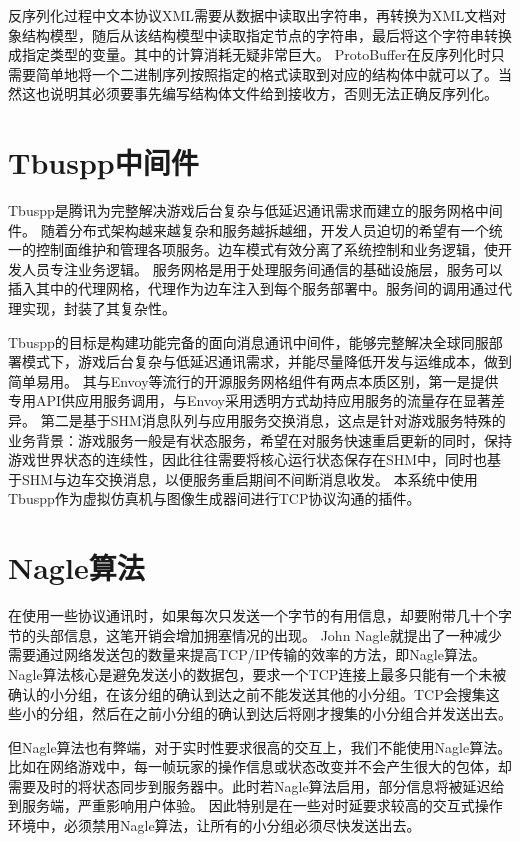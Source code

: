 \par
反序列化过程中文本协议XML需要从数据中读取出字符串，再转换为XML文档对象结构模型，随后从该结构模型中读取指定节点的字符串，最后将这个字符串转换成指定类型的变量。其中的计算消耗无疑非常巨大。
ProtoBuffer在反序列化时只需要简单地将一个二进制序列按照指定的格式读取到对应的结构体中就可以了。当然这也说明其必须要事先编写结构体文件给到接收方，否则无法正确反序列化。
\section{Tbuspp中间件}
Tbuspp是腾讯为完整解决游戏后台复杂与低延迟通讯需求而建立的服务网格中间件。
随着分布式架构越来越复杂和服务越拆越细，开发人员迫切的希望有一个统一的控制面维护和管理各项服务。边车模式有效分离了系统控制和业务逻辑，使开发人员专注业务逻辑\cite{tbus2}。
服务网格是用于处理服务间通信的基础设施层，服务可以插入其中的代理网格，代理作为边车注入到每个服务部署中\cite{tbus1}。服务间的调用通过代理实现，封装了其复杂性。
\par
Tbuspp的目标是构建功能完备的面向消息通讯中间件，能够完整解决全球同服部署模式下，游戏后台复杂与低延迟通讯需求，并能尽量降低开发与运维成本，做到简单易用。
其与Envoy等流行的开源服务网格组件有两点本质区别，第一是提供专用API供应用服务调用，与Envoy采用透明方式劫持应用服务的流量存在显著差异。
第二是基于SHM消息队列与应用服务交换消息，这点是针对游戏服务特殊的业务背景：游戏服务一般是有状态服务，希望在对服务快速重启更新的同时，保持游戏世界状态的连续性，因此往往需要将核心运行状态保存在SHM中，同时也基于SHM与边车交换消息，以便服务重启期间不间断消息收发。
本系统中使用Tbuspp作为虚拟仿真机与图像生成器间进行TCP协议沟通的插件。
\section{Nagle算法}
在使用一些协议通讯时，如果每次只发送一个字节的有用信息，却要附带几十个字节的头部信息，这笔开销会增加拥塞情况的出现。
John Nagle就提出了一种减少需要通过网络发送包的数量来提高TCP/IP传输的效率\cite{nagle2}的方法，即Nagle算法。
Nagle算法核心是避免发送小的数据包，要求一个TCP连接上最多只能有一个未被确认的小分组，在该分组的确认到达之前不能发送其他的小分组。TCP会搜集这些小的分组，然后在之前小分组的确认到达后将刚才搜集的小分组合并发送出去。
\par
但Nagle算法也有弊端，对于实时性要求很高的交互上，我们不能使用Nagle算法\cite{nagle1}。
比如在网络游戏中，每一帧玩家的操作信息或状态改变并不会产生很大的包体，却需要及时的将状态同步到服务器中。此时若Nagle算法启用，部分信息将被延迟给到服务端，严重影响用户体验。
因此特别是在一些对时延要求较高的交互式操作环境中，必须禁用Nagle算法，让所有的小分组必须尽快发送出去。

